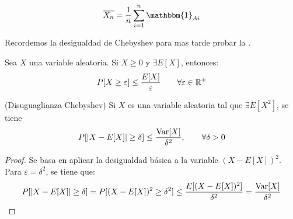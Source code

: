 \begin{equation*}
    \overline{X_n}=\frac{1}{n}\sum_{i=1}^n \mathbbm{1}_{Ai}
\end{equation*}

\noindent
Recordemos la desigualdad de Chebyshev para mas tarde probar la .
\begin{teo}
    Sea $X$ una variable aleatoria. Si $X\geq 0$ y $\exists E[X]$, entonces:
    \begin{equation*}
        P[X\geq \varepsilon]\leq \dfrac{E[X]}{\varepsilon} \qquad \forall \varepsilon\in \mathbb{R}^+
    \end{equation*}
\end{teo}
\begin{prop}(Disuguaglianza Chebyshev)
    Si $X$ es una variable aleatoria tal que $\exists E[X^2]$, se tiene
    \begin{equation*}
        P[|X-E[X]|\geq \delta]\leq \frac{\operatorname{Var}[X]}{\delta^2},\qquad \forall \delta>0
    \end{equation*}
\end{prop}
\begin{proof}
    Se basa en aplicar la desigualdad básica a la variable $(X-E[X])^2$. Para $\varepsilon=\delta^2$, se tiene que:
    \begin{equation*}
        P[|X-E[X]|\geq \delta] = P[(X-E[X])^2\geq \delta^2] \leq \frac{E[(X-E[X])^2]}{\delta^2} = \frac{\operatorname{Var}[X]}{\delta^2}
    \end{equation*}
\end{proof}

